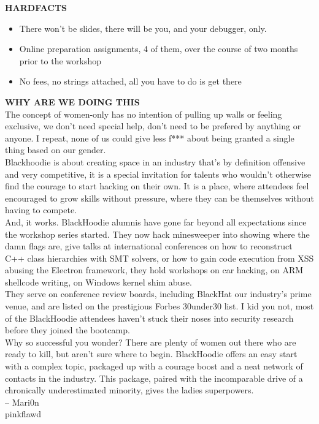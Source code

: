 \textbf{HARDFACTS}
\begin{itemize}
	\item There won’t be slides, there will be you, and your debugger, only.
	\item Online preparation assignments, 4 of them, over the course of two months prior to the workshop
	\item No fees, no strings attached, all you have to do is get there
\end{itemize}

\textbf{WHY ARE WE DOING THIS}\\

The concept of women-only has no intention of pulling up walls or feeling exclusive, we don’t need special help, don’t need to be prefered by anything or anyone. I repeat, none of us could give less f*** about being granted a single thing based on our gender.\\

Blackhoodie is about creating space in an industry that’s by definition offensive and very competitive, it is a special invitation for talents who wouldn’t otherwise find the courage to start hacking on their own. It is a place, where attendees feel encouraged to grow skills without pressure, where they can be themselves without having to compete.\\

And, it works. BlackHoodie alumnis have gone far beyond all expectations since the workshop series started. They now hack minesweeper into showing where the damn flags are, give talks at international conferences on how to reconstruct C++ class hierarchies with SMT solvers, or how to gain code execution from XSS abusing the Electron framework, they hold workshops on car hacking, on ARM shellcode writing, on Windows kernel shim abuse.\\

They serve on conference review boards, including BlackHat our industry’s prime venue, and are listed on the prestigious Forbes 30under30 list. I kid you not, most of the BlackHoodie attendees haven’t stuck their noses into security research before they joined the bootcamp.\\

Why so successful you wonder? There are plenty of women out there who are ready to kill, but aren’t sure where to begin. BlackHoodie offers an easy start with a complex topic, packaged up with a courage boost and a neat network of contacts in the industry. This package, paired with the incomparable drive of a chronically underestimated minority, gives the ladies superpowers.\\

– Mari0n \\
\faTwitter pinkflawd
